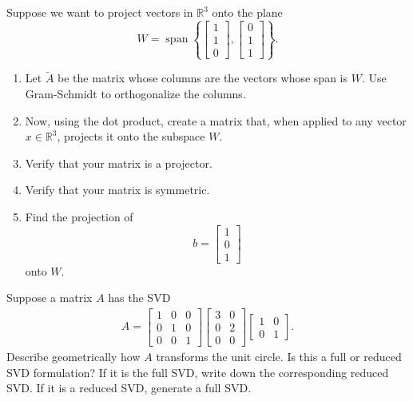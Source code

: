 \documentclass{ximera}
\begin{document}
\begin{exercise}
Suppose we want to project vectors in $\mathbb{R}^3$ onto the plane
\[
W = \operatorname{span}\left\{
\begin{bmatrix}
1 \\ 1 \\ 0
\end{bmatrix},
\begin{bmatrix}
0 \\ 1 \\ 1
\end{bmatrix}
\right\}.
\]
\begin{enumerate}
    \item Let $\tilde{A}$ be the matrix whose columns are the vectors whose span is $W$.  Use Gram-Schmidt to orthogonalize the columns.
    \item Now, using the dot product, create a matrix that, when applied to any vector $x \in \mathbb{R}^3$, projects it onto the subspace $W$.
    \item Verify that your matrix is a projector.
    \item Verify that your matrix is symmetric.
    \item Find the projection of
    \[
    b =
    \begin{bmatrix}
    1 \\ 0 \\ 1
    \end{bmatrix}
    \]
    onto $W$.
\end{enumerate}
\end{exercise}

\begin{exercise}
    Suppose a matrix $A$ has the SVD
    \begin{align*}
        A = \begin{bmatrix}  1 &0 &0 \\ 0& 1 & 0 \\ 0 & 0 &1\end{bmatrix} \begin{bmatrix} 3 &0 \\ 0 & 2 \\ 0 & 0\end{bmatrix} \begin{bmatrix}
            1 & 0 \\ 0 & 1
        \end{bmatrix}.
    \end{align*}
    Describe geometrically how $A$ transforms the unit circle.  Is this a full or reduced SVD formulation?  If it is the full SVD, write down the corresponding reduced SVD.  If it is a reduced SVD, generate a full SVD.
\end{exercise}
\end{document}
